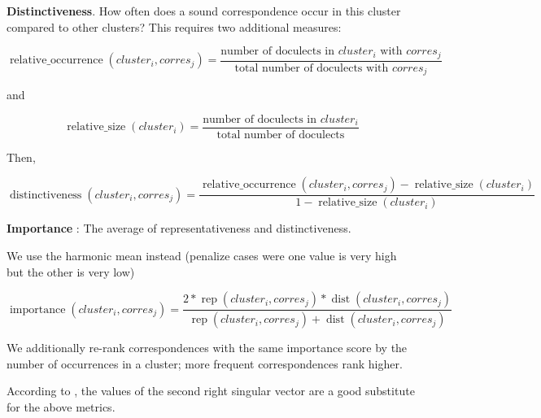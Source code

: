 \documentclass{article}
\begin{document}
\textbf{Distinctiveness}.
How often does a sound correspondence occur in this cluster compared to other clusters? 
This requires two additional measures: 

\begin{equation*}
\operatorname{relative\_occurrence}(cluster_i, corres_j) = 
\frac{\text{number of doculects in } cluster_i \text{ with }  corres_j}
{\text{total number of doculects with } corres_j}
\end{equation*}

and

\begin{equation*}
\operatorname{relative\_size}(cluster_i) = 
\frac{\text{number of doculects in } cluster_i}
{\text{total number of doculects}}
\end{equation*}

Then, 

\begin{equation*}
\operatorname{distinctiveness}(cluster_i, corres_j) = 
\frac{\operatorname{relative\_occurrence}(cluster_i, corres_j) - \operatorname{relative\_size}(cluster_i)}
{1 - \operatorname{relative\_size}(cluster_i)}
\end{equation*}

\textbf{Importance}
\citet{wieling2011bipartite}: 
The average of representativeness and distinctiveness.

We use the harmonic mean instead (penalize cases were one value is very high but the other is very low)

\begin{equation*}
\operatorname{importance}(cluster_i, corres_j) = 
\frac{
2 * \operatorname{rep}(cluster_i, corres_j) * \operatorname{dist}(cluster_i, corres_j)}
{\operatorname{rep}(cluster_i, corres_j) + \operatorname{dist}(cluster_i, corres_j)}
\end{equation*}

We additionally re-rank correspondences with the same importance score by the number of occurrences in a cluster; more frequent correspondences rank higher.


According to \citet{wieling2010hierarchical}, the values of the second right singular vector are a good substitute for the above metrics.
\end{document}
